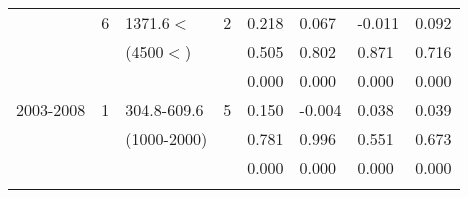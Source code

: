 \begin{table}[p]
\begin{tabular}{cclcllll}
                                                               &  6                                                             & 1371.6$<$                                                             & 2                                                                     & 0.218                                       & 0.067                                           & -0.011                                             & 0.092  \\ 
                                                               &                                                                 & (4500$<$)                                                              &                                                                        & 0.505                                       & 0.802                                           & 0.871                                              & 0.716  \\ 
                                                               &                                                                 &                                                                                &                                                                        & 0.000                                       & 0.000                                           & 0.000                                              & 0.000  \\ \hline\noalign{\smallskip}
2003-2008                                              & 1                                                             & 304.8-609.6                                                            & 5                                                                     & 0.150                                       & -0.004                                          & 0.038                                              & 0.039  \\ 
                                                               &                                                                 & (1000-2000)                                                           &                                                                        & 0.781                                       & 0.996                                           & 0.551                                              & 0.673  \\  
                                                               &                                                                 &                                                                                &                                                                        & 0.000                                       & 0.000                                           & 0.000                                              & 0.000  \\ \cline{5-8}\noalign{\smallskip}

\end{tabular}
\end{table}
